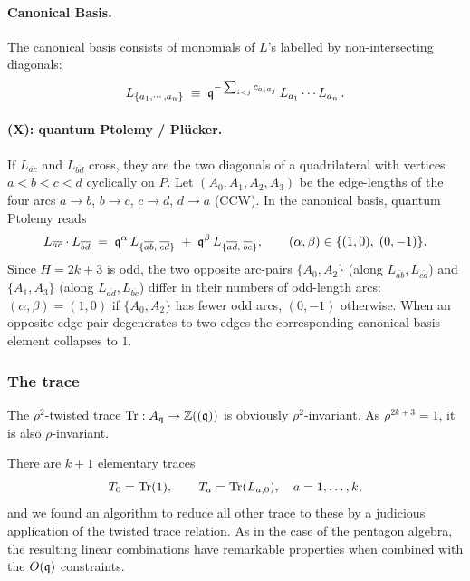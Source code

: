 \documentclass[12pt]{amsart}
\begin{document}
\paragraph{Canonical Basis.}
The canonical basis consists of monomials of $L$'s labelled by
non-intersecting diagonals:
\begin{equation}
  L_{\{a_1, \cdots, a_n\}} \;\equiv\;
    \mathfrak{q}^{-\sum_{i<j} c_{a_i a_j}}\, L_{a_1} \cdots L_{a_n}\, .
\end{equation}

\paragraph{(X): quantum Ptolemy / Pl\"ucker.}
If $L_{\overline{ac}}$ and $L_{\overline{bd}}$ cross, they are the two
diagonals of a quadrilateral with vertices $a < b < c < d$ cyclically
on $P$. Let $(A_0, A_1, A_2, A_3)$ be the edge-lengths of the four arcs
$a \to b$, $b \to c$, $c \to d$, $d \to a$ (CCW). In the canonical
basis, quantum Ptolemy reads
\begin{equation}
  L_{\overline{ac}} \cdot L_{\overline{bd}}
  \;=\; \mathfrak{q}^{\alpha}\, L_{\{\overline{ab},\; \overline{cd}\}}
     \;+\; \mathfrak{q}^{\beta}\, L_{\{\overline{ad},\; \overline{bc}\}},
  \qquad (\alpha, \beta) \in \{(1, 0),\; (0, -1)\}.
\end{equation}
Since $H = 2k{+}3$ is odd, the two opposite arc-pairs $\{A_0, A_2\}$
(along $L_{\overline{ab}}, L_{\overline{cd}}$) and $\{A_1, A_3\}$ (along
$L_{\overline{ad}}, L_{\overline{bc}}$) differ in their numbers of
odd-length arcs:
$(\alpha, \beta) = (1, 0)$ if $\{A_0, A_2\}$ has fewer odd arcs,
$(0, -1)$ otherwise. When an opposite-edge pair degenerates to two
edges the corresponding canonical-basis element collapses to $1$.

\subsubsection{The trace}
The $\rho^2$-twisted trace $\operatorname{Tr}: A_{\mathfrak{q}} \to \mathbb{Z}((\mathfrak{q}))$ is obviously $\rho^2$-invariant. As
$\rho^{2k+3}=1$, it is also $\rho$-invariant.  

There are $k+1$ elementary traces
\begin{equation}
  T_0 = \operatorname{Tr}(1), \qquad T_a = \operatorname{Tr}(L_{a, 0}), \quad a = 1, \ldots, k,
\end{equation}
and we found an algorithm to reduce all other trace to these by a judicious application of 
the twisted trace relation. As in the case of the pentagon algebra, the resulting linear combinations
have remarkable properties when combined with the $O(\mathfrak{q})$ constraints. 
\end{document}
